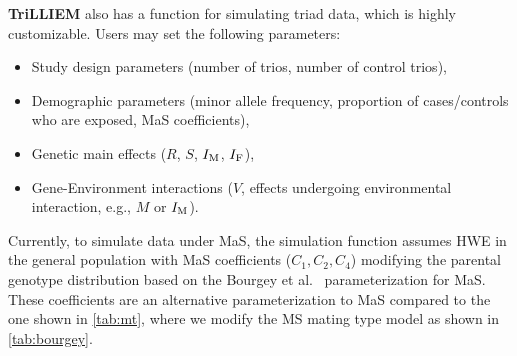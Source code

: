 \textbf{TriLLIEM} also has a function for simulating triad data, which is highly customizable.
Users may set the following parameters:
\begin{itemize}
  \item Study design parameters (number of trios, number of control trios),
  \item Demographic parameters (minor allele frequency, proportion of cases/controls who are exposed, MaS coefficients),
  \item Genetic main effects ($R$, $S$, $I_{{\rm M}}$, $I_{{\rm F}}$),
  \item Gene-Environment interactions ($V$, effects undergoing environmental interaction, e.g., $M$ or $I_{{\rm M}}$).
\end{itemize}
Currently, to simulate data under MaS, the simulation function assumes HWE in the general population with MaS coefficients ($C_1, C_2, C_4$) modifying the parental genotype distribution based on the Bourgey et al.~\cite{Bour+11} parameterization for MaS.
These coefficients are an alternative parameterization to MaS compared to the one shown in \cref{tab:mt}, where we modify the MS mating type model as shown in \cref{tab:bourgey}.

